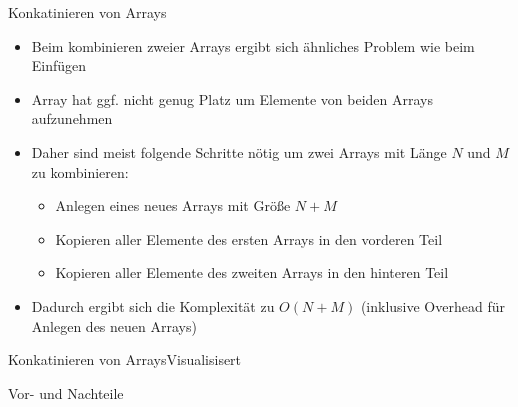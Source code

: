 \begin{frame}{Konkatinieren von Arrays}
	\begin{itemize}
		\item Beim kombinieren zweier Arrays ergibt sich ähnliches Problem wie beim Einfügen
		\item Array hat ggf. nicht genug Platz um Elemente von beiden Arrays aufzunehmen
		\item Daher sind meist folgende Schritte nötig um zwei Arrays mit Länge $N$ und $M$ zu kombinieren:
		\begin{itemize}
			\item Anlegen eines neues Arrays mit Größe $N+M$
			\item Kopieren aller Elemente des ersten Arrays in den vorderen Teil
			\item Kopieren aller Elemente des zweiten Arrays in den hinteren Teil
		\end{itemize}
		\item Dadurch ergibt sich die Komplexität zu $O(N+M)$ (inklusive Overhead für Anlegen des neuen Arrays)
	\end{itemize}
\end{frame}

\begin{frame}{Konkatinieren von Arrays}{Visualisisert}
\end{frame}

\begin{frame}{Vor- und Nachteile}
\end{frame}